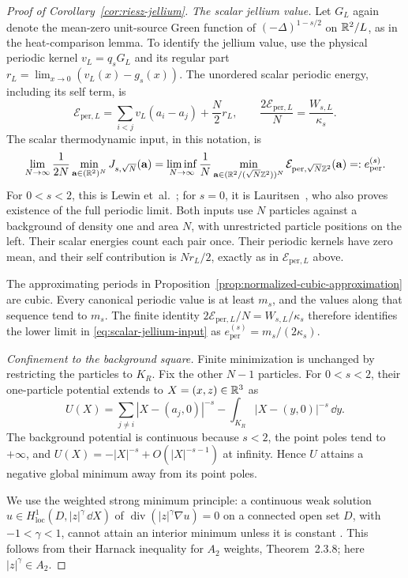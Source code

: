 \begin{proof}[Proof of Corollary~\ref{cor:riesz-jellium}]
\emph{The scalar jellium value.}
Let $G_L$ again denote the mean-zero unit-source Green function of
$(-\Delta)^{1-s/2}$ on $\mathbb R^2/L$, as in the heat-comparison lemma.
To identify the jellium value, use the physical periodic kernel
$v_L=q_sG_L$ and its regular part
$r_L=\lim_{x\to0}(v_L(x)-g_s(x))$.  The unordered scalar periodic
energy, including its self term, is
\[
 \mathcal E_{\mathrm{per},L}
 =\sum_{i<j}v_L(a_i-a_j)+\frac N2r_L,
 \qquad
 \frac{2\mathcal E_{\mathrm{per},L}}N
 =\frac{W_{s,L}}{\kappa_s}.
\]
The scalar thermodynamic input, in this notation, is
\begin{equation}
\label{eq:scalar-jellium-input}
 \lim_{N\to\infty}\frac1{2N}
    \min_{\mathbf a\in(\mathbb R^2)^N}J_{s,\sqrt N}(\mathbf a)
 =
 \liminf_{N\to\infty}\frac1N
    \min_{\mathbf a\in(\mathbb R^2/(\sqrt N\mathbb Z^2))^N}
                   \mathcal E_{\mathrm{per},\sqrt N\mathbb Z^2}(\mathbf a)
 =:e_{\mathrm{per}}^{(s)} .
\end{equation}
For $0<s<2$, this is
Lewin et~al.~\citep[Section~II, (3)--(4), and Section~VI, (25), (27)--(31), Theorem~2]{LewinLiebSeiringer2019};
for $s=0$, it is
Lauritsen~\citep[Section~II and Theorem~II.1]{Lauritsen2021}, who also proves
existence of the full periodic limit.
Both inputs use $N$ particles against a background of density one
and area $N$, with unrestricted particle positions on the left.
Their scalar energies count each pair once.  Their periodic kernels
have zero mean, and their self contribution is $Nr_L/2$, exactly as
in $\mathcal E_{\mathrm{per},L}$ above.

The approximating periods in
Proposition~\ref{prop:normalized-cubic-approximation} are cubic.
Every canonical periodic value is at least $m_s$, and the values
along that sequence tend to $m_s$.  The finite identity
$2\mathcal E_{\mathrm{per},L}/N=W_{s,L}/\kappa_s$ therefore identifies
the lower limit in \eqref{eq:scalar-jellium-input} as
$e_{\mathrm{per}}^{(s)}=m_s/(2\kappa_s)$.

\emph{Confinement to the background square.}
Finite minimization is unchanged by restricting the particles to
$K_R$.  Fix the other $N-1$ particles.  For $0<s<2$, their one-particle
potential extends to $X=(x,z)\in\mathbb R^3$ as
\[
 U(X)=\sum_{j\ne i}|X-(a_j,0)|^{-s}
             -\int_{K_R}|X-(y,0)|^{-s}\,\dd y .
\]
The background potential is continuous because $s<2$, the point
poles tend to $+\infty$, and
$U(X)=-|X|^{-s}+O(|X|^{-s-1})$ at infinity.  Hence $U$ attains
a negative global minimum away from its point poles.

We use the weighted strong minimum principle:
a continuous weak solution
$u\in H^1_{\mathrm{loc}}(D,|z|^\gamma\,\dd X)$ of
$\operatorname{div}(|z|^\gamma\nabla u)=0$ on a connected open set
$D$, with $-1<\gamma<1$, cannot attain an interior minimum unless
it is constant
\citep[Corollary~2.3.10, p.~98]{FabesKenigSerapioni1982}.
This follows from their Harnack inequality for $A_2$ weights,
Theorem~2.3.8; here $|z|^\gamma\in A_2$.


\end{proof}
